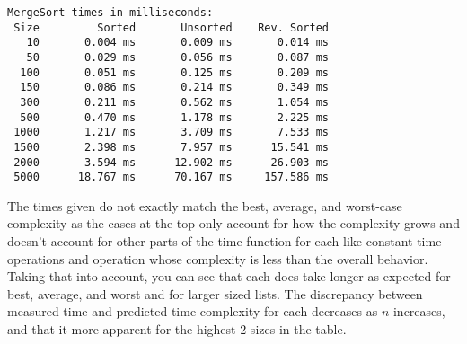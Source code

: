 \documentclass{article}
\begin{document}
\begin{lstlisting}
MergeSort times in milliseconds:                                                              
 Size         Sorted       Unsorted    Rev. Sorted                                              
   10       0.004 ms       0.009 ms       0.014 ms                                              
   50       0.029 ms       0.056 ms       0.087 ms                                             
  100       0.051 ms       0.125 ms       0.209 ms                                             
  150       0.086 ms       0.214 ms       0.349 ms                                             
  300       0.211 ms       0.562 ms       1.054 ms                                             
  500       0.470 ms       1.178 ms       2.225 ms                                            
 1000       1.217 ms       3.709 ms       7.533 ms                                            
 1500       2.398 ms       7.957 ms      15.541 ms                                            
 2000       3.594 ms      12.902 ms      26.903 ms                                            
 5000      18.767 ms      70.167 ms     157.586 ms 
\end{lstlisting}
The times given do not exactly match the best, average, and worst-case complexity as the cases at the top only account for how the complexity grows and doesn't account for other parts of the time function for each like constant time operations and operation whose complexity is less than the overall behavior. Taking that into account, you can see that each does take longer as expected for best, average, and worst and for larger sized lists. The discrepancy between measured time and predicted time complexity for each decreases as $n$ increases, and that it more apparent for the highest 2 sizes in the table.\\
\noindent\makebox[\linewidth]{\rule{\paperwidth}{0.4pt}}
	
\end{document}
